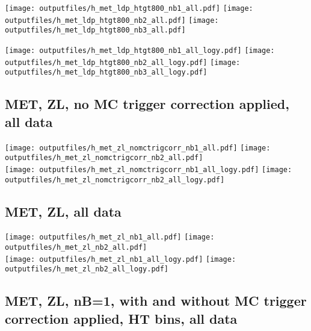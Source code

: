 \documentclass[11pt]{article}
\begin{document}
    \noindent
     \texttt{[image: outputfiles/h\_met\_ldp\_htgt800\_nb1\_all.pdf]}
     \texttt{[image: outputfiles/h\_met\_ldp\_htgt800\_nb2\_all.pdf]}
     \texttt{[image: outputfiles/h\_met\_ldp\_htgt800\_nb3\_all.pdf]}

    \noindent
     \texttt{[image: outputfiles/h\_met\_ldp\_htgt800\_nb1\_all\_logy.pdf]}
     \texttt{[image: outputfiles/h\_met\_ldp\_htgt800\_nb2\_all\_logy.pdf]}
     \texttt{[image: outputfiles/h\_met\_ldp\_htgt800\_nb3\_all\_logy.pdf]}



     \subsection{ MET, ZL, no MC trigger correction applied, all data}

    \noindent
     \texttt{[image: outputfiles/h\_met\_zl\_nomctrigcorr\_nb1\_all.pdf]}
     \texttt{[image: outputfiles/h\_met\_zl\_nomctrigcorr\_nb2\_all.pdf]} \\

    \noindent
     \texttt{[image: outputfiles/h\_met\_zl\_nomctrigcorr\_nb1\_all\_logy.pdf]}
     \texttt{[image: outputfiles/h\_met\_zl\_nomctrigcorr\_nb2\_all\_logy.pdf]}


     \subsection{ MET, ZL, all data}

    \noindent
     \texttt{[image: outputfiles/h\_met\_zl\_nb1\_all.pdf]}
     \texttt{[image: outputfiles/h\_met\_zl\_nb2\_all.pdf]} \\

    \noindent
     \texttt{[image: outputfiles/h\_met\_zl\_nb1\_all\_logy.pdf]}
     \texttt{[image: outputfiles/h\_met\_zl\_nb2\_all\_logy.pdf]}

     \subsection{ MET, ZL, nB=1, with and without MC trigger correction applied, HT bins, all data}
\end{document}
